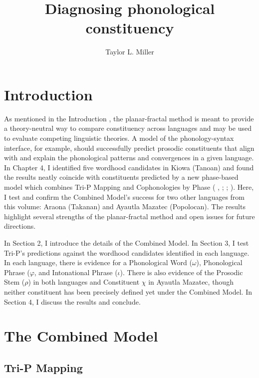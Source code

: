 \documentclass[output=paper]{langscibook}
\author{Taylor L. Miller \affiliation{State University of New York at Oswego}}
\title{Diagnosing phonological constituency}
\begin{document}
\maketitle

\section{Introduction} 
\label{sec:introduction}  

As mentioned in the Introduction , the planar-fractal method is meant to provide a theory-neutral way to compare constituency across languages and may be used to evaluate competing linguistic theories. A model of the phonology-syntax interface, for example, should successfully predict prosodic constituents that align with and explain the phonological patterns and convergences in a given language. In Chapter 4, I identified five wordhood candidates in Kiowa (Tanoan) and found the results neatly coincide with constituents predicted by a new phase-based model \citep{millersande:2021,millersande:2023} which combines Tri-P Mapping \citep{Miller:2018,Miller:2020} and Cophonologies by Phase (\citeauthor{Sande:2017} \citeyear{Sande:Language}, \citeyear{Sande:Phonology}; \mbox{\citealt{Sande&Jenks:2018}}; \citealt{Sande:2020}). Here, I test and confirm the Combined Model's success for two other languages from this volume: Araona (Takanan) and Ayautla Mazatec (Popolocan). The results highlight several strengths of the planar-fractal method and open issues for future directions.

In Section 2, I introduce the details of the Combined Model. In Section 3, I test Tri-P's predictions against the wordhood candidates identified in each language. In each language, there is evidence for a Phonological Word ($\omega$), Phonological Phrase ($\varphi$, and Intonational Phrase ($\iota$). There is also evidence of the Prosodic Stem ($\rho$) in both languages and Constituent $\chi$ in Ayautla Mazatec, though neither constituent has been precisely defined yet under the Combined Model. In Section 4, I discuss the results and conclude.

\section{The Combined Model} 
\label{sec:models}

\subsection{Tri-P Mapping}
\label{sec:trip}
\end{document}
